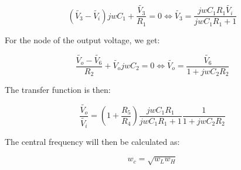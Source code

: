\begin{equation}
        (\widetilde{V_3}-\widetilde{V_i})jwC_1 + \frac{\widetilde{V_3}}{R_1} = 0 \iff \widetilde{V_3} = \frac{jwC_1R_1\widetilde{V_i}}{jwC_1R_1+1}
\end{equation}

For the node of the output voltage, we get:

\begin{equation}
        \frac{\widetilde{V_o}-\widetilde{V_6}}{R_2} + \widetilde{V_o}jwC_2 = 0 \iff \widetilde{V_o} = \frac{\widetilde{V_6}}{1+jwC_2R_2}
\end{equation}

The transfer function is then:

\begin{equation}
        \frac{\widetilde{V_o}}{\widetilde{V_i}} = (1+\frac{R_5}{R_4})\frac{jwC_1R_1}{jwC_1R_1+1}\frac{1}{1+jwC_2R_2}
\end{equation}




The central frequency will then be calculated as:

\begin{equation}
        w_c = \sqrt{w_Lw_H}
\end{equation}

